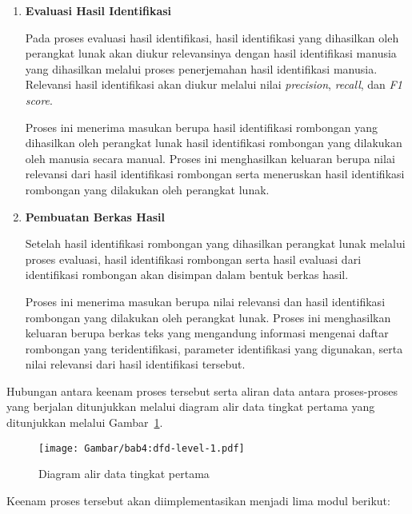 \begin{enumerate}
    \item \textbf{Evaluasi Hasil Identifikasi}
    
    Pada proses evaluasi hasil identifikasi, hasil identifikasi yang dihasilkan oleh perangkat lunak akan diukur relevansinya dengan hasil identifikasi manusia yang dihasilkan melalui proses penerjemahan hasil identifikasi manusia. Relevansi hasil identifikasi akan diukur melalui nilai \textit{precision}, \textit{recall}, dan \textit{F1 score}.
    
    Proses ini menerima masukan berupa hasil identifikasi rombongan yang dihasilkan oleh perangkat lunak hasil identifikasi rombongan yang dilakukan oleh manusia secara manual. Proses ini menghasilkan keluaran berupa nilai relevansi dari hasil identifikasi rombongan serta meneruskan hasil identifikasi rombongan yang dilakukan oleh perangkat lunak.
    
    \item \textbf{Pembuatan Berkas Hasil}
    
    Setelah hasil identifikasi rombongan yang dihasilkan perangkat lunak melalui proses evaluasi, hasil identifikasi rombongan serta hasil evaluasi dari identifikasi rombongan akan disimpan dalam bentuk berkas hasil.
    
    Proses ini menerima masukan berupa nilai relevansi dan hasil identifikasi rombongan yang dilakukan oleh perangkat lunak. Proses ini menghasilkan keluaran berupa berkas teks yang mengandung informasi mengenai daftar rombongan yang teridentifikasi, parameter identifikasi yang digunakan, serta nilai relevansi dari hasil identifikasi tersebut.
\end{enumerate}

\noindent Hubungan antara keenam proses tersebut serta aliran data antara proses-proses yang berjalan ditunjukkan melalui diagram alir data tingkat pertama yang ditunjukkan melalui Gambar~\ref{bab4:dfd-level-1}.

\clearpage

\begin{figure}[t]
    \centering
    \texttt{[image: Gambar/bab4:dfd-level-1.pdf]}
    \caption{Diagram alir data tingkat pertama}
    \label{bab4:dfd-level-1}
\end{figure}

\noindent Keenam proses tersebut akan diimplementasikan menjadi lima modul berikut:

